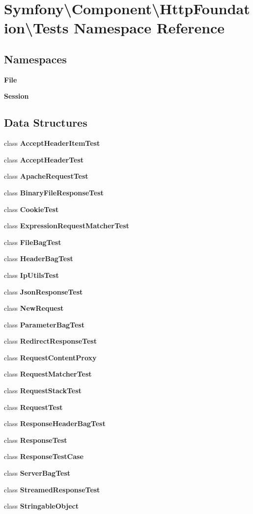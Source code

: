 \section{Symfony\textbackslash{}Component\textbackslash{}Http\+Foundation\textbackslash{}Tests Namespace Reference}
\label{namespace_symfony_1_1_component_1_1_http_foundation_1_1_tests}
\subsection*{Namespaces}
\begin{DoxyCompactItemize}
\item 
 {\bf File}
\item 
 {\bf Session}
\end{DoxyCompactItemize}
\subsection*{Data Structures}
\begin{DoxyCompactItemize}
\item 
class {\bf Accept\+Header\+Item\+Test}
\item 
class {\bf Accept\+Header\+Test}
\item 
class {\bf Apache\+Request\+Test}
\item 
class {\bf Binary\+File\+Response\+Test}
\item 
class {\bf Cookie\+Test}
\item 
class {\bf Expression\+Request\+Matcher\+Test}
\item 
class {\bf File\+Bag\+Test}
\item 
class {\bf Header\+Bag\+Test}
\item 
class {\bf Ip\+Utils\+Test}
\item 
class {\bf Json\+Response\+Test}
\item 
class {\bf New\+Request}
\item 
class {\bf Parameter\+Bag\+Test}
\item 
class {\bf Redirect\+Response\+Test}
\item 
class {\bf Request\+Content\+Proxy}
\item 
class {\bf Request\+Matcher\+Test}
\item 
class {\bf Request\+Stack\+Test}
\item 
class {\bf Request\+Test}
\item 
class {\bf Response\+Header\+Bag\+Test}
\item 
class {\bf Response\+Test}
\item 
class {\bf Response\+Test\+Case}
\item 
class {\bf Server\+Bag\+Test}
\item 
class {\bf Streamed\+Response\+Test}
\item 
class {\bf Stringable\+Object}
\end{DoxyCompactItemize}
